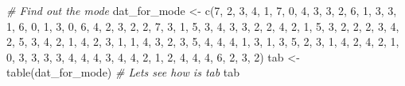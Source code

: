 \documentclass[
]{book}
\newenvironment{Shaded}{\begin{snugshade}}{\end{snugshade}}
\newcommand{\CommentTok}[1]{\textcolor[rgb]{0.56,0.35,0.01}{\textit{#1}}}
\newcommand{\DecValTok}[1]{\textcolor[rgb]{0.00,0.00,0.81}{#1}}
\newcommand{\FunctionTok}[1]{\textcolor[rgb]{0.00,0.00,0.00}{#1}}
\newcommand{\NormalTok}[1]{#1}
\newcommand{\OtherTok}[1]{\textcolor[rgb]{0.56,0.35,0.01}{#1}}
\begin{document}
\begin{Shaded}
\begin{Highlighting}[]
\CommentTok{\# Find out the mode}
\NormalTok{dat\_for\_mode }\OtherTok{\textless{}{-}} \FunctionTok{c}\NormalTok{(}\DecValTok{7}\NormalTok{, }\DecValTok{2}\NormalTok{, }\DecValTok{3}\NormalTok{, }\DecValTok{4}\NormalTok{, }\DecValTok{1}\NormalTok{, }\DecValTok{7}\NormalTok{, }\DecValTok{0}\NormalTok{, }\DecValTok{4}\NormalTok{, }\DecValTok{3}\NormalTok{, }\DecValTok{3}\NormalTok{, }\DecValTok{2}\NormalTok{, }\DecValTok{6}\NormalTok{, }\DecValTok{1}\NormalTok{, }\DecValTok{3}\NormalTok{, }\DecValTok{3}\NormalTok{, }\DecValTok{1}\NormalTok{, }\DecValTok{6}\NormalTok{, }\DecValTok{0}\NormalTok{, }\DecValTok{1}\NormalTok{, }\DecValTok{3}\NormalTok{, }\DecValTok{0}\NormalTok{, }\DecValTok{6}\NormalTok{, }\DecValTok{4}\NormalTok{, }\DecValTok{2}\NormalTok{, }\DecValTok{3}\NormalTok{, }\DecValTok{2}\NormalTok{, }\DecValTok{2}\NormalTok{, }\DecValTok{7}\NormalTok{, }\DecValTok{3}\NormalTok{, }\DecValTok{1}\NormalTok{, }\DecValTok{5}\NormalTok{, }\DecValTok{3}\NormalTok{, }\DecValTok{4}\NormalTok{, }\DecValTok{3}\NormalTok{, }\DecValTok{3}\NormalTok{, }\DecValTok{2}\NormalTok{, }\DecValTok{2}\NormalTok{, }\DecValTok{4}\NormalTok{, }\DecValTok{2}\NormalTok{, }\DecValTok{1}\NormalTok{, }\DecValTok{5}\NormalTok{, }\DecValTok{3}\NormalTok{, }\DecValTok{2}\NormalTok{, }\DecValTok{2}\NormalTok{, }\DecValTok{2}\NormalTok{, }\DecValTok{3}\NormalTok{, }\DecValTok{4}\NormalTok{, }\DecValTok{2}\NormalTok{, }\DecValTok{5}\NormalTok{, }\DecValTok{3}\NormalTok{, }\DecValTok{4}\NormalTok{, }\DecValTok{2}\NormalTok{, }\DecValTok{1}\NormalTok{, }\DecValTok{4}\NormalTok{, }\DecValTok{2}\NormalTok{, }\DecValTok{3}\NormalTok{, }\DecValTok{1}\NormalTok{, }\DecValTok{1}\NormalTok{, }\DecValTok{4}\NormalTok{, }\DecValTok{3}\NormalTok{, }\DecValTok{2}\NormalTok{, }\DecValTok{3}\NormalTok{, }\DecValTok{5}\NormalTok{, }\DecValTok{4}\NormalTok{, }\DecValTok{4}\NormalTok{, }\DecValTok{4}\NormalTok{, }\DecValTok{1}\NormalTok{, }\DecValTok{3}\NormalTok{, }\DecValTok{1}\NormalTok{, }\DecValTok{3}\NormalTok{, }\DecValTok{5}\NormalTok{, }\DecValTok{2}\NormalTok{, }\DecValTok{3}\NormalTok{, }\DecValTok{1}\NormalTok{, }\DecValTok{4}\NormalTok{, }\DecValTok{2}\NormalTok{, }\DecValTok{4}\NormalTok{, }\DecValTok{2}\NormalTok{, }\DecValTok{1}\NormalTok{, }\DecValTok{0}\NormalTok{, }\DecValTok{3}\NormalTok{, }\DecValTok{3}\NormalTok{, }\DecValTok{3}\NormalTok{, }\DecValTok{3}\NormalTok{, }\DecValTok{4}\NormalTok{, }\DecValTok{4}\NormalTok{, }\DecValTok{4}\NormalTok{, }\DecValTok{3}\NormalTok{, }\DecValTok{4}\NormalTok{, }\DecValTok{4}\NormalTok{, }\DecValTok{2}\NormalTok{, }\DecValTok{1}\NormalTok{, }\DecValTok{2}\NormalTok{, }\DecValTok{4}\NormalTok{, }\DecValTok{4}\NormalTok{, }\DecValTok{4}\NormalTok{, }\DecValTok{6}\NormalTok{, }\DecValTok{2}\NormalTok{, }\DecValTok{3}\NormalTok{, }\DecValTok{2}\NormalTok{)}
\NormalTok{tab }\OtherTok{\textless{}{-}} \FunctionTok{table}\NormalTok{(dat\_for\_mode)}
\CommentTok{\# Let\textquotesingle{}s see how is tab}
\NormalTok{tab}
\end{Highlighting}
\end{Shaded}
\end{document}
